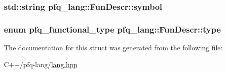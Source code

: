 \hypertarget{structpfq__lang_1_1FunDescr_a7d95e70cba06a41f63bcc960900c83ff}{
\subsubsection[{symbol}]{\setlength{\rightskip}{0pt plus 5cm}std\-::string pfq\-\_\-lang\-::\-Fun\-Descr\-::symbol}}\label{structpfq__lang_1_1FunDescr_a7d95e70cba06a41f63bcc960900c83ff}
\hypertarget{structpfq__lang_1_1FunDescr_a48a16971f3d255aed8551bc0690913cf}{
\subsubsection[{type}]{\setlength{\rightskip}{0pt plus 5cm}enum pfq\-\_\-functional\-\_\-type pfq\-\_\-lang\-::\-Fun\-Descr\-::type}}\label{structpfq__lang_1_1FunDescr_a48a16971f3d255aed8551bc0690913cf}


The documentation for this struct was generated from the following file\-:\begin{DoxyCompactItemize}
\item 
C++/pfq-\/lang/\hyperlink{lang_8hpp}{lang.\-hpp}\end{DoxyCompactItemize}
